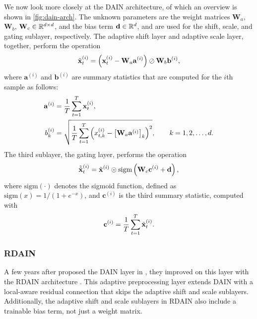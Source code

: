 \documentclass{statsmsc}
\begin{document}
{We now look more closely at  the \ac{DAIN} architecture, of which an overview is shown
in \cref{fig:dain-arch}. The unknown parameters are the weight matrices
$\mathbf{W}_a$, $\mathbf{W}_b$, $\mathbf{W}_c \in \mathbb{R}^{d \times d}$, and the bias
term $\mathbf{d} \in \mathbb{R}^d$, and are used
for the shift, scale, and gating sublayer, respectively. The adaptive shift layer and
adaptive scale layer, together, perform the operation
\begin{equation}\label{eq:dain_tild}
    \tilde{\mathbf{x}}_t^{(i)}=\left(
        \mathbf{x}_t^{(i)}-\mathbf{W}_a \mathbf{a}^{(i)}
    \right) \oslash \mathbf{W}_b \mathbf{b}^{(i)},
\end{equation}
where $\mathbf{a}^{(i)}$ and $\mathbf{b}^{(i)}$ are summary statistics that are computed for
the $i$th sample as follows:
\begin{align}
    \mathbf{a}^{(i)}& =\frac{1}{T} \sum^{T}_{t=1} \mathbf{x}_t^{(i)}, \label{eq:dain_a}\\
    b_k^{(i)}&=\sqrt{
    \frac{1}{T} \sum^{T}_{t=1} \left(x^{(i)}_{t,k} - \left[\mathbf{W}_a  \mathbf{a}^{(i)}\right]_k \right)^2},
    \qquad k=1,2,\dots,d. \label{eq:dain_b}
\end{align}
The third sublayer, the gating layer, performs the operation
\begin{equation}
    \tilde{\tilde{\mathbf{x}}}_t^{(i)}=\tilde{\mathbf{x}}^{(i)} \odot \textrm{sigm}\left( \mathbf{W}_c \mathbf{c}^{(i)} + \mathbf{d}\right),
\end{equation}
where $\textrm{sigm}(\cdot)$ denotes the sigmoid function, defined as
$\textrm{sigm}(x)=1/(1+e^{-x})$, and $\mathbf{c}^{(i)}$ is the third summary statistic, computed
with
\begin{equation}
    \mathbf{c}^{(i)}=\frac{1}{T} \sum^{T}_{t=1} \tilde{\mathbf{x}}_t^{(i)}.
\end{equation}


\subsubsection{RDAIN}%
\label{ssub:RDAIN}

A few years after \citeauthor{dain} proposed the \ac{DAIN} layer in \citeyear{dain}, they
improved on
this layer with the \ac{RDAIN} architecture \citep{rdain}. This adaptive preprocessing layer
extends \ac{DAIN} with a local-aware residual connection that skips the adaptive shift and
scale sublayers. Additionally, the adaptive shift and scale sublayers in \ac{RDAIN} also
include a trainable bias term, not just a weight matrix.

}
\end{document}
